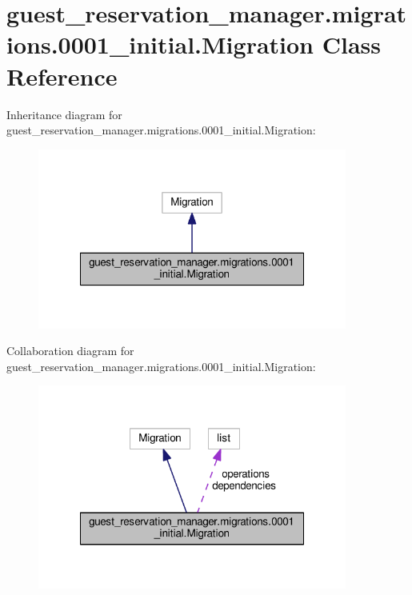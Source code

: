 \hypertarget{classguest__reservation__manager_1_1migrations_1_10001__initial_1_1Migration}{\section{guest\-\_\-reservation\-\_\-manager.\-migrations.0001\-\_\-initial.Migration Class Reference}
\label{classguest__reservation__manager_1_1migrations_1_10001__initial_1_1Migration}
}


Inheritance diagram for guest\-\_\-reservation\-\_\-manager.\-migrations.0001\-\_\-initial.Migration\-:
\nopagebreak
\begin{figure}[H]
\begin{center}
\leavevmode
\includegraphics[width=288pt]{classguest__reservation__manager_1_1migrations_1_10001__initial_1_1Migration__inherit__graph}
\end{center}
\end{figure}


Collaboration diagram for guest\-\_\-reservation\-\_\-manager.\-migrations.0001\-\_\-initial.Migration\-:
\nopagebreak
\begin{figure}[H]
\begin{center}
\leavevmode
\includegraphics[width=288pt]{classguest__reservation__manager_1_1migrations_1_10001__initial_1_1Migration__coll__graph}
\end{center}
\end{figure}
